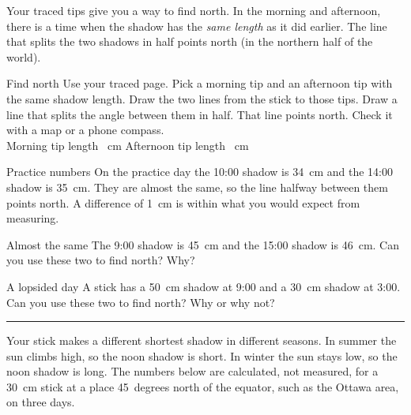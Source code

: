 Your traced tips give you a way to find north. In the morning and afternoon, there is a time when the shadow has the \emph{same length} as it did earlier. The line that splits the two shadows in half points north (in the northern half of the world).

\begin{tryit}{Find north}
Use your traced page. Pick a morning tip and an afternoon tip with the same shadow length. Draw the two lines from the stick to those tips. Draw a line that splits the angle between them in half. That line points north. Check it with a map or a phone compass.\\[4pt]
Morning tip length \wline[1.6cm]~cm \quad Afternoon tip length \wline[1.6cm]~cm
\end{tryit}

\begin{center}
\end{center}

\begin{worked}{Practice numbers}
On the practice day the 10:00 shadow is 34~cm and the 14:00 shadow is 35~cm. They are almost the same, so the line halfway between them points north. A difference of 1~cm is within what you would expect from measuring.
\end{worked}

\begin{puzzle}{Almost the same}
The 9:00 shadow is 45~cm and the 15:00 shadow is 46~cm. Can you use these two to find north? \wline[1.6cm] Why? \wline[5cm]
\end{puzzle}

\begin{puzzle}{A lopsided day}
A stick has a 50~cm shadow at 9:00 and a 30~cm shadow at 3:00. Can you use these two to find north? \wline[1.6cm] Why or why not?\\
\rule{\linewidth}{0.5pt}
\end{puzzle}
\clearpage
{}
Your stick makes a different shortest shadow in different seasons. In summer the sun climbs high, so the noon shadow is short. In winter the sun stays low, so the noon shadow is long. The numbers below are calculated, not measured, for a 30~cm stick at a place 45~degrees north of the equator, such as the Ottawa area, on three days.

